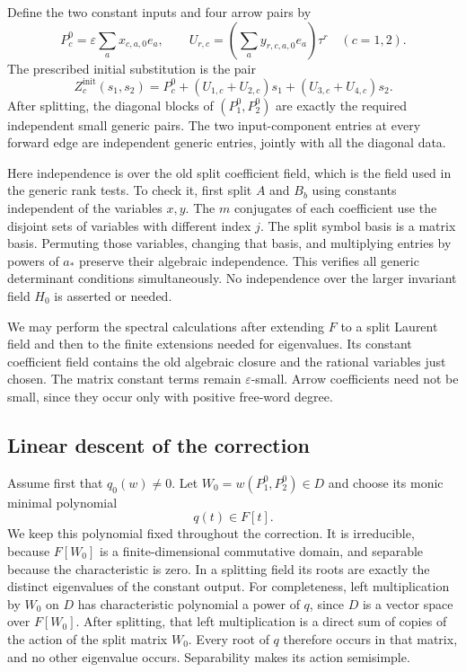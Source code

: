 Define the two constant inputs and four arrow pairs by
\[
 P_c^0=\varepsilon\sum_a x_{c,a,0}e_a,
 \qquad
 U_{r,c}=\left(\sum_a y_{r,c,a,0}e_a\right)\tau^r
 \quad(c=1,2).
\]
The prescribed initial substitution is the pair
\begin{equation}
 Z_c^{\mathrm{init}}(s_1,s_2)
 =P_c^0+(U_{1,c}+U_{2,c})s_1
             +(U_{3,c}+U_{4,c})s_2.
 \label{eq:division-initial-input}
\end{equation}
After splitting, the diagonal blocks of $(P_1^0,P_2^0)$ are exactly
the required independent small generic pairs.  The two input-component
entries at every forward edge are independent generic entries, jointly
with all the diagonal data.

Here independence is over the old split coefficient field, which is the
field used in the generic rank tests.  To check it, first split $A$ and
$B_b$ using constants independent of the variables $x,y$.  The $m$
conjugates of each coefficient use the disjoint sets of variables with
different index $j$.  The split symbol basis is a matrix basis.
Permuting those variables, changing that basis, and multiplying entries
by powers of $a_*$ preserve their algebraic independence.  This verifies
all generic determinant conditions simultaneously.  No independence
over the larger invariant field $H_0$ is asserted or needed.

We may perform the spectral calculations after extending $F$ to a
split Laurent field and then to the finite extensions needed for
eigenvalues.  Its constant coefficient field contains the old algebraic
closure and the rational variables just chosen.  The matrix constant
terms remain $\varepsilon$-small.  Arrow coefficients need not be
small, since they occur only with positive free-word degree.

\subsection{Linear descent of the correction}

Assume first that $q_0(w)\ne0$.  Let $W_0=w(P_1^0,P_2^0)\in D$
and choose its monic minimal polynomial
\begin{equation}
 q(t)\in F[t].
 \label{eq:fixed-central-polynomial}
\end{equation}
We keep this polynomial fixed throughout the correction.  It is
irreducible, because $F[W_0]$ is a finite-dimensional commutative
domain, and separable because the characteristic is zero.  In a
splitting field its roots are exactly the distinct eigenvalues of the
constant output.  For completeness, left multiplication by $W_0$ on
$D$ has characteristic polynomial a power of $q$, since $D$ is a
vector space over $F[W_0]$.  After splitting, that left multiplication
is a direct sum of copies of the action of the split matrix $W_0$.
Every root of $q$ therefore occurs in that matrix, and no other
eigenvalue occurs.  Separability makes its action semisimple.

